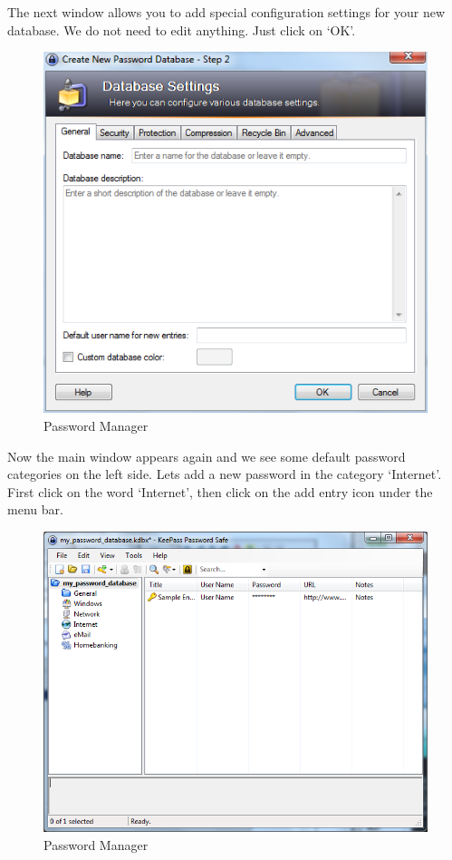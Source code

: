 The next window allows you to add special configuration settings for
your new database. We do not need to edit anything. Just click on `OK'.

\begin{figure}[htbp]
\centering
\includegraphics{mng_11.png}
\caption{Password Manager}
\end{figure}

Now the main window appears again and we see some default password
categories on the left side. Lets add a new password in the category
`Internet'. First click on the word `Internet', then click on the add
entry icon under the menu bar.

\begin{figure}[htbp]
\centering
\includegraphics{mng_12.png}
\caption{Password Manager}
\end{figure}

